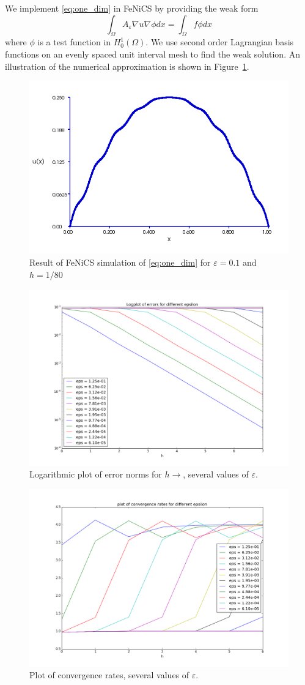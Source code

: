 \documentclass{article}
\renewcommand{\epsilon}{\varepsilon}
\begin{document}
We implement \eqref{eq:one_dim} in FeNiCS by providing the weak form
\begin{equation}
    \int_\Omega A_\epsilon\nabla u\nabla\phi dx= \int_\Omega f\phi dx
\end{equation}
where $\phi$ is a test function in $H^1_0(\Omega)$. We use second order Lagrangian basis functions on an evenly spaced unit interval mesh to find the weak solution.
An illustration of the numerical approximation is shown in Figure~\ref{fig:one_dim_approx}. 

\begin{figure}[ht]
    \centering
    \includegraphics[width=0.5\linewidth]{one_dim_approx.png}
    \caption{Result of FeNiCS simulation of \eqref{eq:one_dim} for $\epsilon=0.1$ and $h = 1/80$}
    \label{fig:one_dim_approx}
\end{figure}

\begin{figure}[ht]
    \centering
    \includegraphics[width=0.5\linewidth]{one_dim_h_eps1.png}
    \caption{Logarithmic plot of error norms for $h\to$, several values of $\epsilon$.}
    \label{fig:one_dim_h_eps1}
\end{figure}

\begin{figure}[ht]
    \centering
    \includegraphics[width=0.5\linewidth]{one_dim_h_eps2.png}
    \caption{Plot of convergence rates, several values of $\epsilon$.}
    \label{fig:one_dim_h_eps2}
\end{figure}
\end{document}
